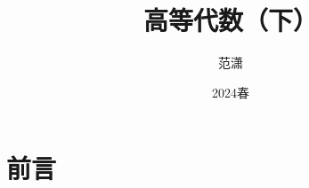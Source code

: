\documentclass[a4paper]{report}
\author{\Large{范潇}}
\title{\sffamily\Huge\bfseries{高等代数（下）}}
\date{\Large{2024{\hspace*{1\ccwd}}春}}
\begin{document}
\maketitle
\tableofcontents
\chapter*{前言}




\end{document}

